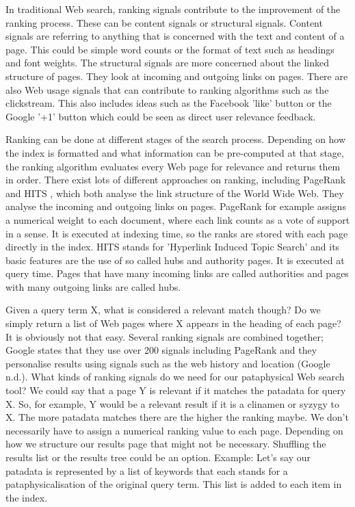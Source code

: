 In traditional Web search, ranking signals contribute to the improvement of the ranking process. These can be content signals or structural signals. Content signals are referring to anything that is concerned with the text and content of a page. This could be simple word counts or the format of text such as headings and font weights. The structural signals are more concerned about the linked structure of pages. They look at incoming and outgoing links on pages. There are also Web usage signals that can contribute to ranking algorithms such as the clickstream. This also includes ideas such as the Facebook 'like' button or the Google '+1' button which could be seen as direct user relevance feedback.

Ranking can be done at different stages of the search process. Depending on how the index is formatted and what information can be pre-computed at that stage, the ranking algorithm evaluates every Web page for relevance and returns them in order. There exist lots of different approaches on ranking, including PageRank \citep{Brin1998} and HITS \citep{Kleinberg1999}, which both analyse the link structure of the World Wide Web. They analyse the incoming and outgoing links on pages. PageRank for example assigns a numerical weight to each document, where each link counts as a vote of support in a sense. It is executed at indexing time, so the ranks are stored with each page directly in the index. HITS stands for 'Hyperlink Induced Topic Search' and its basic features are the use of so called hubs and authority pages. It is executed at query time. Pages that have many incoming links are called authorities and pages with many outgoing links are called hubs.

Given a query term X, what is considered a relevant match though? Do we simply return a list of Web pages where X appears in the heading of each page? It is obviously not that easy. Several ranking signals are combined together; Google states that they use over 200 signals including PageRank and they personalise results using signals such as the web history and location (Google n.d.).
What kinds of ranking signals do we need for our pataphysical Web search tool? We could say that a page Y is relevant if it matches the patadata for query X. So, for example, Y would be a relevant result if it is a clinamen or syzygy to X. The more patadata matches there are the higher the ranking maybe. We don't necessarily have to assign a numerical ranking value to each page. Depending on how we structure our results page that might not be necessary. Shuffling the results list or the results tree could be an option.
Example: Let's say our patadata is represented by a list of keywords that each stands for a pataphysicalisation of the original query term. This list is added to each item in the index.

